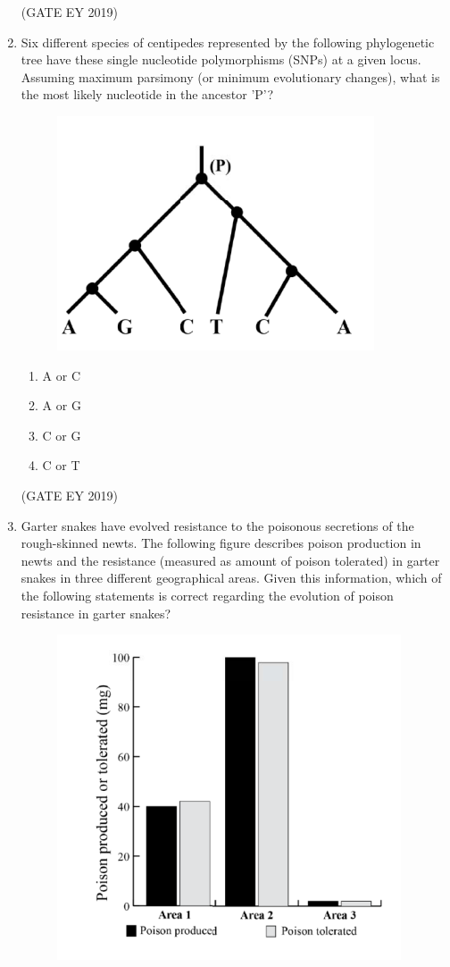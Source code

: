 \documentclass[journal,12pt,onecolumn]{IEEEtran}
\theoremstyle{remark}
\begin{document}
\begin{enumerate}
\hfill{(GATE EY 2019)}
\item Six different species of centipedes represented by the following phylogenetic tree have these single nucleotide polymorphisms (SNPs) at a given locus. Assuming maximum parsimony (or minimum evolutionary changes), what is the most likely nucleotide in the ancestor 'P'?
\begin{figure}[H]
    \centering
    \includegraphics[]{figs/34.png}
    \caption{}
    \label{fig:7}
\end{figure}

\begin{multicols}{2}
\begin{enumerate}
\item A or C
\item A or G
\item C or G
\item C or T
\end{enumerate}
\end{multicols}
\hfill{(GATE EY 2019)}

\item Garter snakes have evolved resistance to the poisonous secretions of the rough-skinned newts. The following figure describes poison production in newts and the resistance (measured as amount of poison tolerated) in garter snakes in three different geographical areas. Given this information, which of the following statements is correct regarding the evolution of poison resistance in garter snakes?
\begin{figure}[h]
    \centering
    \includegraphics[]{figs/35.png}
    \caption{}
    \label{fig:8`}
\end{figure}


\end{enumerate}
\end{document}
